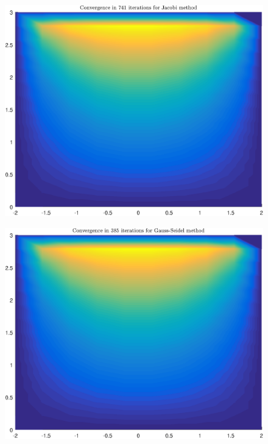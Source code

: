 \documentclass[11pt]{article}
\begin{document}
\begin{figure}
\centering
\begin{minipage}{.45\textwidth}
\centering
\includegraphics[width=\linewidth]{math609_pa3_comp_example_2_104_n_Jacobi.eps}
\label{fig:test1}
\end{minipage}\hfill
\begin{minipage}{.45\textwidth}
\centering
\includegraphics[width=\linewidth]{math609_pa3_comp_example_2_104_n_Gauss-Seidel.eps}
\label{fig:test2}
\end{minipage}\hfill

\end{figure}
\end{document}
